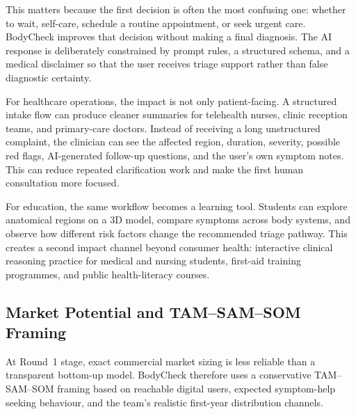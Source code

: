 This matters because the first decision is often the most confusing one:
whether to wait, self-care, schedule a routine appointment, or seek urgent
care. BodyCheck improves that decision without making a final diagnosis. The
AI response is deliberately constrained by prompt rules, a structured schema,
and a medical disclaimer so that the user receives triage support rather than
false diagnostic certainty.

For healthcare operations, the impact is not only patient-facing. A structured
intake flow can produce cleaner summaries for telehealth nurses, clinic
reception teams, and primary-care doctors. Instead of receiving a long
unstructured complaint, the clinician can see the affected region, duration,
severity, possible red flags, AI-generated follow-up questions, and the user's
own symptom notes. This can reduce repeated clarification work and make the
first human consultation more focused.

For education, the same workflow becomes a learning tool. Students can explore
anatomical regions on a 3D model, compare symptoms across body systems, and
observe how different risk factors change the recommended triage pathway. This
creates a second impact channel beyond consumer health: interactive clinical
reasoning practice for medical and nursing students, first-aid training
programmes, and public health-literacy courses.

\subsection{Market Potential and TAM--SAM--SOM Framing}
\label{sec:impact-market}

At Round~1 stage, exact commercial market sizing is less reliable than a
transparent bottom-up model. BodyCheck therefore uses a conservative
TAM--SAM--SOM framing based on reachable digital users, expected symptom-help
seeking behaviour, and the team's realistic first-year distribution channels.

